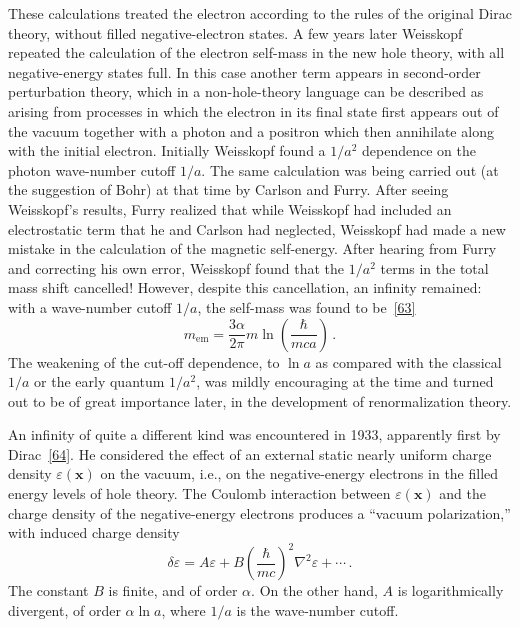 These calculations treated the electron according to the rules of the original Dirac theory, without filled negative-electron states. A few years later Weisskopf repeated the calculation of the electron self-mass in the new hole theory, with all negative-energy states full. In this case another term appears in second-order perturbation theory, which in a non-hole-theory language can be described as arising from processes in which the electron in its final state first appears out of the vacuum together with a photon and a positron which then annihilate along with the initial electron. Initially Weisskopf found a $1/a^2$ dependence on the photon wave-number cutoff $1/a$. The same calculation was being carried out (at the suggestion of Bohr) at that time by Carlson and Furry. After seeing Weisskopf's results, Furry realized that while Weisskopf had included an electrostatic term that he and Carlson had neglected, Weisskopf had made a new mistake in the calculation of the magnetic self-energy. After hearing from Furry and correcting his own error, Weisskopf found that the $1/a^2$ terms in the total mass shift cancelled! However, despite this cancellation, an infinity remained: with a wave-number cutoff $1/a$, the self-mass was found to be~\hyperref[ref:1.63]{[63]}
\begin{equation}
  m_{\mathrm{em}}=\frac{3\alpha}{2\pi}m\ln\!\left(\frac{\hbar}{mca}\right)\,.
  \tag{1.3.2}\label{eq:1.3.2}
\end{equation}
The weakening of the cut-off dependence, to $\ln a$ as compared with the classical $1/a$ or the early quantum $1/a^2$, was mildly encouraging at the time and turned out to be of great importance later, in the development of renormalization theory.

An infinity of quite a different kind was encountered in 1933, apparently first by Dirac~\hyperref[ref:1.64]{[64]}. He considered the effect of an external static nearly uniform charge density $\varepsilon(\mathbf{x})$ on the vacuum, i.e., on the negative-energy electrons in the filled energy levels of hole theory. The Coulomb interaction between $\varepsilon(\mathbf{x})$ and the charge density of the negative-energy electrons produces a ``vacuum polarization,'' with induced charge density
\begin{equation}
  \delta\varepsilon=A\varepsilon+B\left(\frac{\hbar}{mc}\right)^2\nabla^2\varepsilon+\cdots\,.
  \tag{1.3.3}\label{eq:1.3.3}
\end{equation}
The constant $B$ is finite, and of order $\alpha$. On the other hand, $A$ is logarithmically divergent, of order $\alpha\ln a$, where $1/a$ is the wave-number cutoff.

